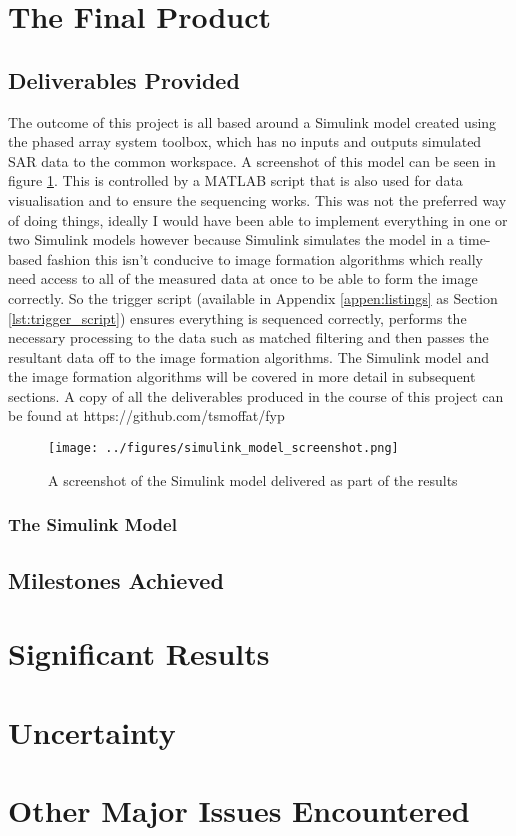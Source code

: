 \section{The Final Product}
\subsection{Deliverables Provided}
The outcome of this project is all based around a Simulink model created using the phased array system toolbox, which has no inputs and outputs simulated SAR data to the common workspace. A screenshot of this model can be seen in figure \ref{fig:simulink_model}. This is controlled by a MATLAB script that is also used for data visualisation and to ensure the sequencing works. This was not the preferred way of doing things, ideally I would have been able to implement everything in one or two Simulink models however because Simulink simulates the model in a time-based fashion this isn't conducive to image formation algorithms which really need access to all of the measured data at once to be able to form the image correctly. So the trigger script (available in Appendix \ref{appen:listings} as Section \ref{lst:trigger_script}) ensures everything is sequenced correctly, performs the necessary processing to the data such as matched filtering and then passes the resultant data off to the image formation algorithms. The Simulink model and the image formation algorithms will be covered in more detail in subsequent sections. A copy of all the deliverables produced in the course of this project can be found at https://github.com/tsmoffat/fyp



\begin{landscape}
\begin{figure}
\centering
\texttt{[image: ../figures/simulink\_model\_screenshot.png]}
\caption{A screenshot of the Simulink model delivered as part of the results}
\label{fig:simulink_model}	
\end{figure}
\end{landscape}

\subsubsection{The Simulink Model}


\subsection{Milestones Achieved}
\section{Significant Results}
\section{Uncertainty}
\section{Other Major Issues Encountered}

